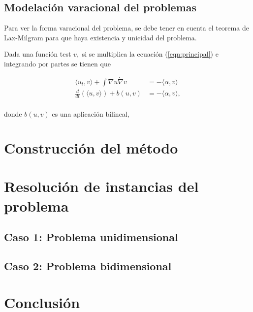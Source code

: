 \documentclass[12pt,paperletter]{article}
\begin{document}
\subsection{Modelación varacional del problemas}
Para ver la forma varacional del problema, se debe tener en cuenta el teorema de Lax-Milgram para que haya existencia y unicidad del problema.

Dada una función test $v, $ si se multiplica la ecuación (\ref{eqn:principal}) e integrando por partes se tienen que 

\begin{align*}
    \langle u_t, v \rangle + \int \nabla u \dot \nabla v   &= - \langle \alpha , v \rangle \\
    \frac{d}{dt} (\langle u, v \rangle)+ b(u,v)&=-\langle \alpha , v \rangle, \\
\end{align*}

donde $b(u,v)$ es una aplicación bilineal, 

\section{Construcción del método}

\newpage
\section{Resolución de instancias del problema}

\subsection{Caso 1: Problema unidimensional }


\subsection{Caso 2: Problema bidimensional}




\newpage
\section{Conclusión}
\end{document}
